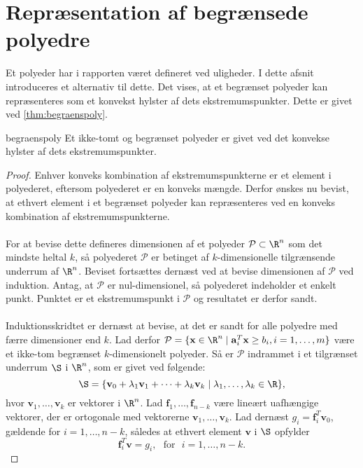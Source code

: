 \section{Repræsentation af begrænsede polyedre}
%
Et polyeder har i rapporten været defineret ved uligheder. 
I dette afsnit introduceres et alternativ til dette. 
Det vises, at et begrænset polyeder kan repræsenteres som et konvekst hylster af dets ekstremumspunkter. 
Dette er givet ved \ref{thm:begraenspoly}. 
\begin{thm}{}{begraenspoly}
Et ikke-tomt og begrænset polyeder er givet ved det konvekse hylster af dets ekstremumspunkter.
\end{thm}
%
\begin{proof}
Enhver konveks kombination af ekstremumspunkterne er et element i polyederet, eftersom polyederet er en konveks mængde. 
Derfor ønskes nu bevist, at ethvert element i et begrænset polyeder kan repræsenteres ved en konveks kombination af ekstremumspunkterne. 
\\\\
For at bevise dette defineres dimensionen af et polyeder $\mathcal{P} \subset \R^n$ som det mindste heltal $k$, så polyederet $\mathcal{P}$ er betinget af $k$-dimensionelle tilgrænsende underrum af $\R^n$. 
Beviset fortsættes dernæst ved at bevise dimensionen af $\mathcal{P}$ ved induktion. 
Antag, at $\mathcal{P}$ er nul-dimensionel, så polyederet indeholder et enkelt punkt. 
Punktet er et ekstremumspunkt i $\mathcal{P}$ og resultatet er derfor sandt. \\\\
Induktionsskridtet er dernæst at bevise, at det er sandt for alle polyedre med færre dimensioner end $k$. Lad derfor $\mathcal{P} = \{\textbf{x} \in \R^n \mid \mathbf{a}_{i}^T \textbf{x} \geq b_i, i=1,\ldots,m\}$ være et ikke-tom begrænset $k$-dimensionelt polyeder. 
Så er $\mathcal{P}$ indrammet i et tilgrænset underrum $\S$ i $\R^n$, som er givet ved følgende: \\
$$\S = \{\textbf{v}_0+\lambda_1 \textbf{v}_1+\cdots+\lambda_k\textbf{v}_k \mid \lambda_1,\ldots,\lambda_k \in \R\},$$
hvor $\textbf{v}_1,\ldots,\textbf{v}_k$ er vektorer i $\R^n$. 
Lad $\textbf{f}_1,\ldots,\textbf{f}_{n-k}$ være lineært uafhængige vektorer, der er ortogonale med vektorerne $\textbf{v}_1,\ldots,\textbf{v}_k$. 
Lad dernæst $g_i=\mathbf{f}_{i}^T \textbf{v}_0$, gældende for $i=1,\ldots,n-k$, således at ethvert element $\textbf{v}$ i $\S$ opfylder 
$$\mathbf{f}_{i}^T \textbf{v}=g_i, \text{     } \text{for} \text{     } i=1,\ldots,n-k.$$ 

\end{proof}
